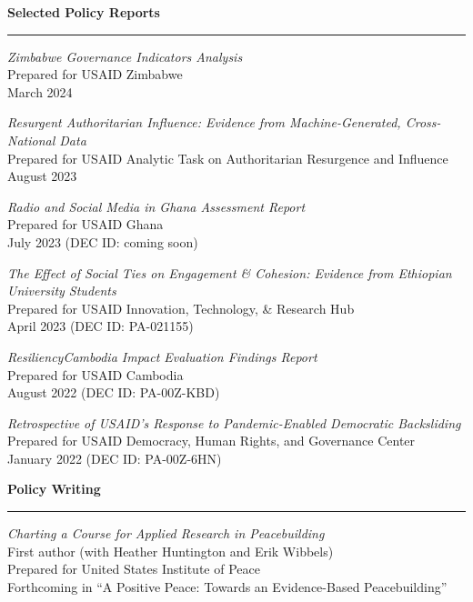 \documentclass[11pt]{article}
\begin{document}
\textbf{\large Selected Policy Reports}\\
\rule[3mm]{\textwidth}{.2pt}

{\sl Zimbabwe Governance Indicators Analysis}\\
Prepared for USAID Zimbabwe\\
March 2024

{\sl Resurgent Authoritarian Influence: Evidence from Machine-Generated, Cross-National Data}\\
Prepared for USAID Analytic Task on Authoritarian Resurgence and Influence\\
August 2023

{\sl Radio and Social Media in Ghana Assessment Report}\\
Prepared for USAID Ghana\\
July 2023 (DEC ID: coming soon)

{\sl The Effect of Social Ties on Engagement \& Cohesion: Evidence from Ethiopian University Students}\\
Prepared for USAID Innovation, Technology, \& Research Hub\\
April 2023 (DEC ID: PA-021155)

{\sl ResiliencyCambodia Impact Evaluation Findings Report}\\
Prepared for USAID Cambodia\\
August 2022 (DEC ID: PA-00Z-KBD)

{\sl  Retrospective of USAID’s Response to Pandemic-Enabled Democratic Backsliding}\\
Prepared for USAID Democracy, Human Rights, and Governance Center\\
January 2022 (DEC ID: PA-00Z-6HN)

\textbf{\large Policy Writing}\\
\rule[3mm]{\textwidth}{.2pt}
{\sl Charting a Course for Applied Research in Peacebuilding}\\
First author (with Heather Huntington and Erik Wibbels)\\
Prepared for United States Institute of Peace\\
Forthcoming in ``A Positive Peace: Towards an Evidence-Based Peacebuilding''



\end{document}
